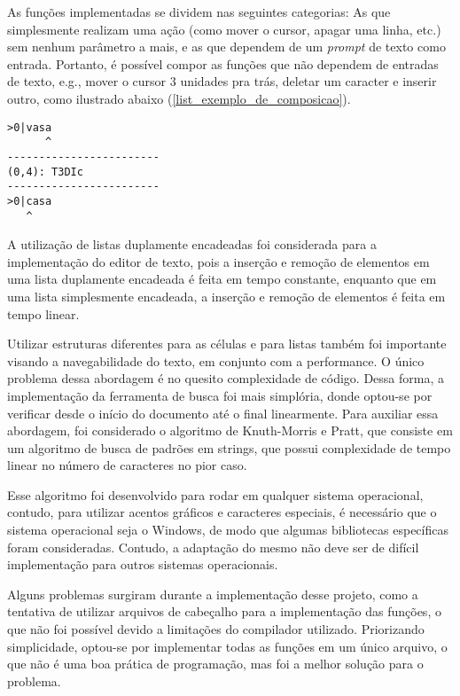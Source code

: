 \documentclass[a4paper, 11pt]{article}
\begin{document}
As funções implementadas se dividem nas seguintes categorias: As que simplesmente realizam uma ação (como mover o cursor, apagar uma linha, etc.) sem nenhum parâmetro a mais, e as que dependem de um \textit{prompt} de texto como entrada. Portanto, é possível compor as funções que não dependem de entradas de texto, e.g., mover o cursor 3 unidades pra trás, deletar um caracter e inserir outro, como ilustrado abaixo (\ref{list_exemplo_de_composicao}).

\begin{lstlisting}[caption={Exemplo de composição de funções}, label={list_exemplo_de_composicao}, language={[ansi]C},firstnumber=1]
>0|vasa
      ^
------------------------
(0,4): T3DIc
------------------------
>0|casa
   ^
\end{lstlisting}

A utilização de listas duplamente encadeadas foi considerada para a implementação do editor de texto, pois a inserção e remoção de elementos em uma lista duplamente encadeada é feita em tempo constante, enquanto que em uma lista simplesmente encadeada, a inserção e remoção de elementos é feita em tempo linear. 

Utilizar estruturas diferentes para as células e para listas também foi importante visando a navegabilidade do texto, em conjunto com a performance. O único problema dessa abordagem é no quesito complexidade de código. Dessa forma, a implementação da ferramenta de busca foi mais simplória, donde optou-se por verificar desde o início do documento até o final linearmente. Para auxiliar essa abordagem, foi considerado o algoritmo de Knuth-Morris e Pratt, que consiste em um algoritmo de busca de padrões em strings, que possui complexidade de tempo linear no número de caracteres no pior caso.

Esse algoritmo foi desenvolvido para rodar em qualquer sistema operacional, contudo, para utilizar acentos gráficos e caracteres especiais, é necessário que o sistema operacional seja o Windows, de modo que algumas bibliotecas específicas foram consideradas. Contudo, a adaptação do mesmo não deve ser de difícil implementação para outros sistemas operacionais.

Alguns problemas surgiram durante a implementação desse projeto, como a tentativa de utilizar arquivos de cabeçalho para a implementação das funções, o que não foi possível devido a limitações do compilador utilizado. Priorizando simplicidade, optou-se por implementar todas as funções em um único arquivo, o que não é uma boa prática de programação, mas foi a melhor solução para o problema.
\end{document}
